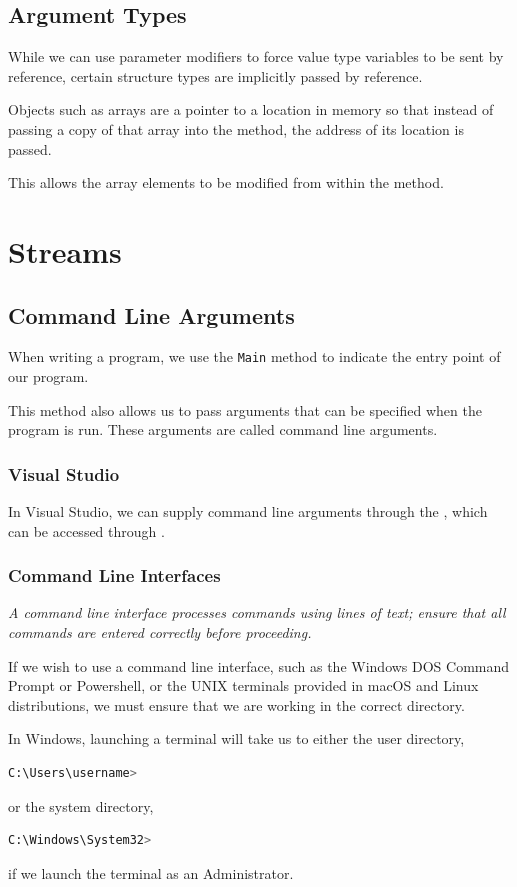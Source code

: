 \documentclass{article}
\begin{document}
\subsection{Argument Types}
While we can use parameter modifiers to force value type variables to be
sent by reference, certain structure types are implicitly passed by reference.

Objects such as arrays are a pointer to a location in memory so that
instead of passing a copy of that array into the method,
the address of its location is passed.

This allows the array elements to be modified from within
the method.
\section{Streams}
\subsection{Command Line Arguments}
When writing a program, we use the \lstinline{Main}
method to indicate the entry point of our program.

This method also allows us to pass arguments that can be
specified when the program is run. These arguments are called
command line arguments.
\subsubsection{Visual Studio}
In Visual Studio, we can supply command line arguments
through the , which can be accessed through
.
\subsubsection{Command Line Interfaces}
\emph{A command line interface processes commands using lines of text;
    ensure that all commands are entered correctly before proceeding.}

\vspace*{0.3cm}
If we wish to use a command line interface, such as the Windows DOS Command Prompt
or Powershell, or the UNIX terminals provided in macOS and Linux distributions,
we must ensure that we are working in the correct directory.
\begin{tcolorboxlarge}[title={Windows DOS}]
    In Windows, launching a terminal will take us to either the user directory,
    \begin{lstlisting}[language=bash,numbers=none]
C:\Users\username>\end{lstlisting}
    or the system directory,
    \begin{lstlisting}[language=bash, numbers=none]
C:\Windows\System32>\end{lstlisting}
    if we launch the terminal as an Administrator.
\end{tcolorboxlarge}
\end{document}
